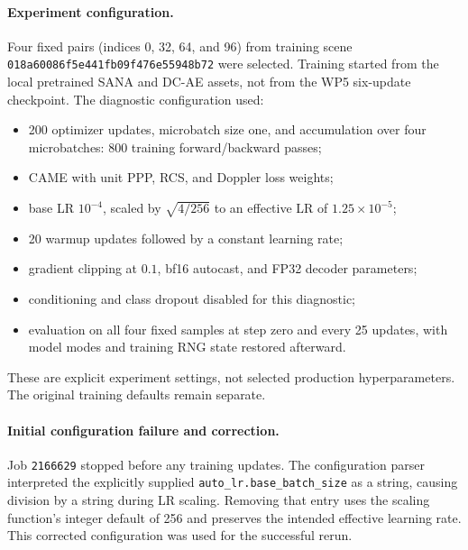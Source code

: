 \documentclass[11pt,a4paper]{article}
\begin{document}
\paragraph{Experiment configuration.}
Four fixed pairs (indices 0, 32, 64, and 96) from training scene
\texttt{018a60086f5e441fb09f476e55948b72} were selected. Training started
from the local pretrained SANA and DC-AE assets, not from the WP5
six-update checkpoint. The diagnostic configuration used:
\begin{itemize}
    \item 200 optimizer updates, microbatch size one, and accumulation
          over four microbatches: 800 training forward/backward passes;
    \item CAME with unit PPP, RCS, and Doppler loss weights;
    \item base LR $10^{-4}$, scaled by $\sqrt{4/256}$ to an effective
          LR of $1.25\times10^{-5}$;
    \item 20 warmup updates followed by a constant learning rate;
    \item gradient clipping at $0.1$, bf16 autocast, and FP32 decoder parameters;
    \item conditioning and class dropout disabled for this diagnostic;
    \item evaluation on all four fixed samples at step zero and every
          25 updates, with model modes and training RNG state restored afterward.
\end{itemize}
These are explicit experiment settings, not selected production
hyperparameters. The original training defaults remain separate.

\paragraph{Initial configuration failure and correction.}
Job \texttt{2166629} stopped before any training updates. The configuration
parser interpreted the explicitly supplied \texttt{auto\_lr.base\_batch\_size}
as a string, causing division by a string during LR scaling. Removing
that entry uses the scaling function's integer default of 256 and
preserves the intended effective learning rate. This corrected
configuration was used for the successful rerun.
\end{document}
